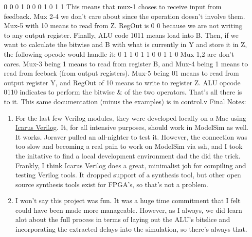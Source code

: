 \documentclass[12pt]{article}
\begin{document}
\newline {}  0  0  0  1  0  0      0      1   0   1   1
\newline \newline
This means that mux-1 choses to receive input from feedback. Mux 2-4 we don't care about since the operation doesn't involve them. Mux-5 with 10 means to read from Z. RegOut is 0 0 because we are not writing to any output register. Finally, ALU code 1011 means load into B.
\newline \newline
Then, if we want to calculate the bitwise and B with what is currently in Y and store it in Z, the following opcode would handle it:
\newline {}  0  1  1  0  1  1      0      0   1   1   0
\newline \newline
Mux-1,2 are don't cares. Mux-3 being 1 means to read from register B, and Mux-4 being 1 means to read from feeback (from output registers). Mux-5 being 01 means to read from output register Y, and RegOut of 10 means to write to register Z. ALU opcode 0110 indicates to perform the bitwise \& of the two operators. 
\newline \newline
That's all there is to it. This same documentation (minus the examples) is in control.v
\newline \newline
Final Notes:
\begin{enumerate}
  \item For the last few Verilog modules, they were developed locally on a Mac using \href{http://iverilog.icarus.com/}{Icarus Verilog}. It, 
	for all intensive purposes, should work in ModelSim as well. It works. Joraver pulled an all-nighter to test it.
  However, the connection was too slow and becoming a real pain to work on ModelSim via ssh, and I took 
	the initative to find a local development environment dad the did the trick. Frankly, I think Icarus Verilog does a great, minimalist job 
	for compiling and testing Verilog tools. It dropped support of a synthesis tool, but other open source synthesis tools exist for 
	FPGA's, so that's not a problem.

	\item I won't say this project was fun. It was a huge time commitment that I felt could have been made more manageable. However, 
	as I always, we did learn alot about the full process in terms of laying out the ALU's bitslice and incorporating the extracted delays 
	into the simulation, so there's always that.
\end{enumerate}
\end{document}
